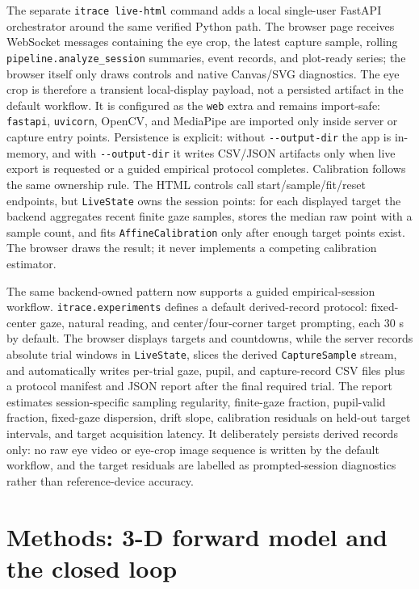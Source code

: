 \documentclass[
]{article}
\begin{document}
The separate \texttt{itrace\ live-html} command adds a local single-user
FastAPI orchestrator around the same verified Python path. The browser
page receives WebSocket messages containing the eye crop, the latest
capture sample, rolling \texttt{pipeline.analyze\_session} summaries,
event records, and plot-ready series; the browser itself only draws
controls and native Canvas/SVG diagnostics. The eye crop is therefore a
transient local-display payload, not a persisted artifact in the default
workflow. It is configured as the \texttt{web} extra and remains
import-safe: \texttt{fastapi}, \texttt{uvicorn}, OpenCV, and MediaPipe
are imported only inside server or capture entry points. Persistence is
explicit: without \texttt{-\/-output-dir} the app is in-memory, and with
\texttt{-\/-output-dir} it writes CSV/JSON artifacts only when live
export is requested or a guided empirical protocol completes.
Calibration follows the same ownership rule. The HTML controls call
start/sample/fit/reset endpoints, but \texttt{LiveState} owns the
session points: for each displayed target the backend aggregates recent
finite gaze samples, stores the median raw point with a sample count,
and fits \texttt{AffineCalibration} only after enough target points
exist. The browser draws the result; it never implements a competing
calibration estimator.

The same backend-owned pattern now supports a guided empirical-session
workflow. \texttt{itrace.experiments} defines a default derived-record
protocol: fixed-center gaze, natural reading, and center/four-corner
target prompting, each 30 s by default. The browser displays targets and
countdowns, while the server records absolute trial windows in
\texttt{LiveState}, slices the derived \texttt{CaptureSample} stream,
and automatically writes per-trial gaze, pupil, and capture-record CSV
files plus a protocol manifest and JSON report after the final required
trial. The report estimates session-specific sampling regularity,
finite-gaze fraction, pupil-valid fraction, fixed-gaze dispersion, drift
slope, calibration residuals on held-out target intervals, and target
acquisition latency. It deliberately persists derived records only: no
raw eye video or eye-crop image sequence is written by the default
workflow, and the target residuals are labelled as prompted-session
diagnostics rather than reference-device accuracy.

\section{Methods: 3-D forward model and the closed
loop}\label{sec:forward}
\end{document}
